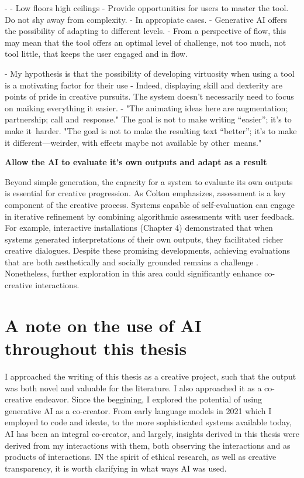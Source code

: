  -     - Low floors high ceilings \cite{Resnick2005-fs}
    - Provide opportunities for users to master the tool. Do not shy away from complexity. 
    - In appropiate cases. 
    - Generative AI offers the possibility of adapting to different levels. 
    - From a perspective of flow, this may mean that the tool offers an optimal level of challenge, not too much, not tool little, that keeps the user engaged and in flow. 
    
    - My hypothesis is that the possibility of developing virtuosity when using a tool is a motivating factor for their use
    - Indeed, displaying skill and dexterity are points of pride in creative pursuits. The system doesn't necessarily need to focus on maiking everything it easier. 
- \cite{Sloan2016-fj} "The animating ideas here are augmentation; partnership; call and response." The goal is not to make writing “easier”; it’s to make it harder. "The goal is not to make the resulting text “better”; it’s to make it different—weirder, with effects maybe not available by other means."

\item \textbf{Allow the AI to evaluate it's own outputs and adapt as a result}

Beyond simple generation, the capacity for a system to evaluate its own outputs is essential for creative progression. As Colton \cite{Colton2021-bt} emphasizes, assessment is a key component of the creative process. Systems capable of self-evaluation can engage in iterative refinement by combining algorithmic assessments with user feedback. For example, interactive installations (Chapter 4) demonstrated that when systems generated interpretations of their own outputs, they facilitated richer creative dialogues. Despite these promising developments, achieving evaluations that are both aesthetically and socially grounded remains a challenge \cite{Bown2024-yx, Lubart2005-zi}. Nonetheless, further exploration in this area could significantly enhance co-creative interactions.



\section{A note on the use of AI throughout this thesis}

I approached the writing of this thesis as a creative project, such that the output was both novel and valuable for the literature. I also approached it as a co-creative endeavor. Since the beggining, I explored the potential of using generative AI as a co-creator. From early language models in 2021 which I employed to code and ideate, to the more sophisticated systems available today, AI has been an integral co-creator, and largely, insights derived in this thesis were derived from my interactions with them, both observing the interactions and as products of interactions. IN the spirit of ethical research, as well as creative transparency, it is worth clarifying in what ways AI was used. 

